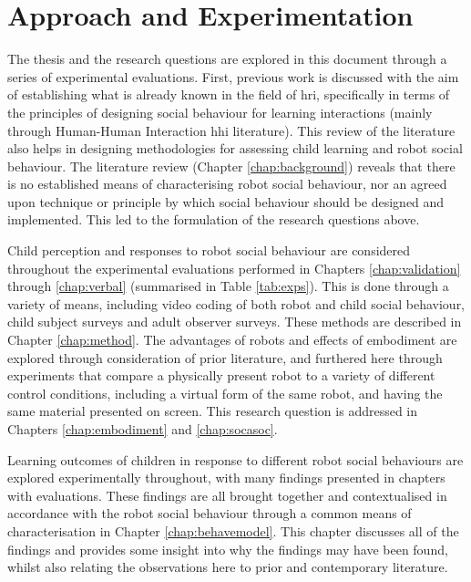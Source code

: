 \section{Approach and Experimentation}\label{sec:intro-exps}
The thesis and the research questions are explored in this document through a series of experimental evaluations. First, previous work is discussed with the aim of establishing what is already known in the field of \acrshort{hri}, specifically in terms of the principles of designing social behaviour for \gls{learning} interactions (mainly through Human-Human Interaction \acrshort{hhi} literature). This review of the literature also helps in designing methodologies for assessing child \gls{learning} and robot social behaviour. The literature review (Chapter \ref{chap:background}) reveals that there is no established means of characterising robot social behaviour, nor an agreed upon technique or principle by which social behaviour should be designed and implemented. This led to the formulation of the research questions above.

Child perception and responses to robot social behaviour are considered throughout the experimental evaluations performed in Chapters \ref{chap:validation} through \ref{chap:verbal} (summarised in Table \ref{tab:exps}). This is done through a variety of means, including video coding of both robot and child social behaviour, child subject surveys and adult observer surveys. These methods are described in Chapter \ref{chap:method}. The advantages of robots and effects of embodiment are explored through consideration of prior literature, and furthered here through experiments that compare a physically present robot to a variety of different control conditions, including a virtual form of the same robot, and having the same material presented on screen. This research question is addressed in Chapters \ref{chap:embodiment} and \ref{chap:socasoc}.

Learning outcomes of children in response to different robot social behaviours are explored experimentally throughout, with many findings presented in chapters with evaluations. These findings are all brought together and contextualised in accordance with the robot social behaviour through a common means of characterisation in Chapter \ref{chap:behavemodel}. This chapter discusses all of the findings and provides some insight into why the findings may have been found, whilst also relating the observations here to prior and contemporary literature.

